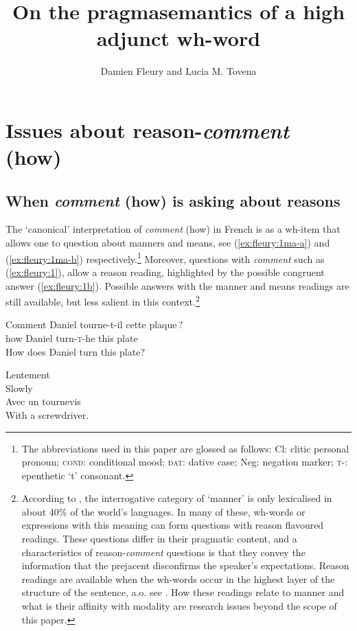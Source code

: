 \documentclass[output=paper,colorlinks,citecolor=brown,
]{langscibook}
\author{Damien Fleury\affiliation{University of Paris} and Lucia M. Tovena\affiliation{Universit\'e de Paris}}
\title{On the pragmasemantics of a high adjunct wh-word}
\begin{document}
\maketitle


\section{Issues about reason-\textit{comment} (how)}\label{intro}

\subsection{When \textit{comment} (how) is asking about reasons}

The `canonical' interpretation of  \textit{comment} (how) in French is as a wh-item that allows one to question about manners and means, see   (\ref{ex:fleury:1ma-a}) and (\ref{ex:fleury:1ma-b}) respectively.\footnote{The abbreviations used in this paper are glossed as follows: Cl: clitic personal pronoun; \textsc{cond}: conditional mood; \textsc{dat}: dative case; Neg: negation marker; \textsc{t}-: epenthetic `t' consonant.}
Moreover, questions with \textit{comment} such as  (\ref{ex:fleury:1}), 
allow a {reason reading}, highlighted by the possible congruent answer   (\ref{ex:fleury:1b}).
Possible answers with the manner and means readings
are still available, but less salient in this context.\footnote{According to \cite{Cysouw04}, the interrogative category of `manner' is only lexicalised in about 40\% of the world's languages. In many of these, wh-words or expressions with this meaning can form questions with reason flavoured readings. These questions differ in their pragmatic content, and a characteristics of reason-\textit{comment} questions is that they convey the information that the prejacent disconfirms the speaker's expectations. Reason readings are available when the wh-words occur in the highest layer of the structure of the sentence, a.o. see \citep{Rizzi01,Ko05,Tsai08}. How these readings relate to manner and what is their affinity with modality are research issues beyond the scope of this paper.}

\begin{exe}
\ex\label{ex:fleury:1ma} \gll  Comment Daniel tourne-t-il cette plaque\,?  \\
  how Daniel turn-\textsc{t}-he this plate  \\
\glt   How does Daniel turn this plate?
\begin{xlist}
\ex\label{ex:fleury:1ma-a}
\gll Lentement\\
Slowly\\
\ex \label{ex:fleury:1ma-b}
\gll Avec un tournevis \\ 
With a screwdriver.\\
\end{xlist}
\end{exe}
\end{document}
